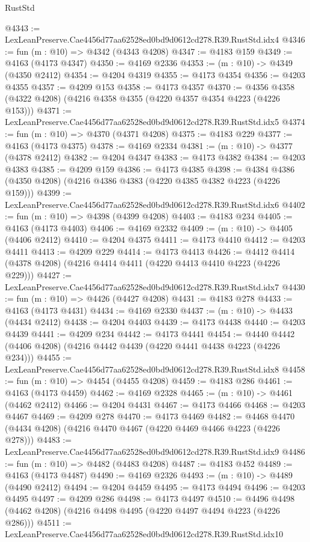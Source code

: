 \begin{lexlean}{RustStd}
\begin{coremodule}
@4343 := LexLeanPreserve.Cae4456d77aa62528ed0bd9d0612cd278.R39.RustStd.idx4
@4346 := fun (m : @10) => @4342 (@4343 @4208)
@4347 := @4183 @159
@4349 := @4163 (@4173 @4347)
@4350 := @4169 @2336
@4353 := (m : @10) -> @4349 (@4350 @2412)
@4354 := @4204 @4319
@4355 := @4173 @4354
@4356 := @4203 @4355
@4357 := @4209 @153
@4358 := @4173 @4357
@4370 := @4356 @4358 (@4322 @4208) (@4216 @4358 @4355 (@4220 @4357 @4354 @4223 (@4226 @153)))
@4371 := LexLeanPreserve.Cae4456d77aa62528ed0bd9d0612cd278.R39.RustStd.idx5
@4374 := fun (m : @10) => @4370 (@4371 @4208)
@4375 := @4183 @229
@4377 := @4163 (@4173 @4375)
@4378 := @4169 @2334
@4381 := (m : @10) -> @4377 (@4378 @2412)
@4382 := @4204 @4347
@4383 := @4173 @4382
@4384 := @4203 @4383
@4385 := @4209 @159
@4386 := @4173 @4385
@4398 := @4384 @4386 (@4350 @4208) (@4216 @4386 @4383 (@4220 @4385 @4382 @4223 (@4226 @159)))
@4399 := LexLeanPreserve.Cae4456d77aa62528ed0bd9d0612cd278.R39.RustStd.idx6
@4402 := fun (m : @10) => @4398 (@4399 @4208)
@4403 := @4183 @234
@4405 := @4163 (@4173 @4403)
@4406 := @4169 @2332
@4409 := (m : @10) -> @4405 (@4406 @2412)
@4410 := @4204 @4375
@4411 := @4173 @4410
@4412 := @4203 @4411
@4413 := @4209 @229
@4414 := @4173 @4413
@4426 := @4412 @4414 (@4378 @4208) (@4216 @4414 @4411 (@4220 @4413 @4410 @4223 (@4226 @229)))
@4427 := LexLeanPreserve.Cae4456d77aa62528ed0bd9d0612cd278.R39.RustStd.idx7
@4430 := fun (m : @10) => @4426 (@4427 @4208)
@4431 := @4183 @278
@4433 := @4163 (@4173 @4431)
@4434 := @4169 @2330
@4437 := (m : @10) -> @4433 (@4434 @2412)
@4438 := @4204 @4403
@4439 := @4173 @4438
@4440 := @4203 @4439
@4441 := @4209 @234
@4442 := @4173 @4441
@4454 := @4440 @4442 (@4406 @4208) (@4216 @4442 @4439 (@4220 @4441 @4438 @4223 (@4226 @234)))
@4455 := LexLeanPreserve.Cae4456d77aa62528ed0bd9d0612cd278.R39.RustStd.idx8
@4458 := fun (m : @10) => @4454 (@4455 @4208)
@4459 := @4183 @286
@4461 := @4163 (@4173 @4459)
@4462 := @4169 @2328
@4465 := (m : @10) -> @4461 (@4462 @2412)
@4466 := @4204 @4431
@4467 := @4173 @4466
@4468 := @4203 @4467
@4469 := @4209 @278
@4470 := @4173 @4469
@4482 := @4468 @4470 (@4434 @4208) (@4216 @4470 @4467 (@4220 @4469 @4466 @4223 (@4226 @278)))
@4483 := LexLeanPreserve.Cae4456d77aa62528ed0bd9d0612cd278.R39.RustStd.idx9
@4486 := fun (m : @10) => @4482 (@4483 @4208)
@4487 := @4183 @452
@4489 := @4163 (@4173 @4487)
@4490 := @4169 @2326
@4493 := (m : @10) -> @4489 (@4490 @2412)
@4494 := @4204 @4459
@4495 := @4173 @4494
@4496 := @4203 @4495
@4497 := @4209 @286
@4498 := @4173 @4497
@4510 := @4496 @4498 (@4462 @4208) (@4216 @4498 @4495 (@4220 @4497 @4494 @4223 (@4226 @286)))
@4511 := LexLeanPreserve.Cae4456d77aa62528ed0bd9d0612cd278.R39.RustStd.idx10

\end{coremodule}
\end{lexlean}
